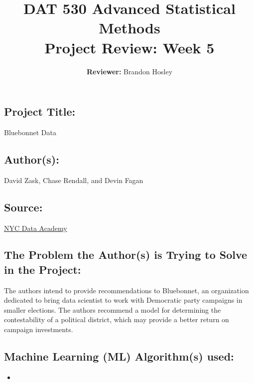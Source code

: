 \documentclass[]{article}
\title{\textbf{DAT 530 Advanced Statistical Methods}\\
	\normalsize{Project Review: Week 5} }
\author{\textbf{Reviewer: }
	Brandon Hosley}
\begin{document}
\setlength{\droptitle}{-10em} 
\pretitle{\begin{flushleft}\LARGE} %
	\posttitle{\end{flushleft}}
\preauthor{\begin{flushleft}\large} %
	\postauthor{\end{flushleft}}
\predate{\begin{flushleft}\large} %
	\postdate{\end{flushleft}}
\maketitle

\vspace{-2em}

\subsection*{Project Title:}
Bluebonnet Data

\subsection*{Author(s):}
David Zask, Chase Rendall, and Devin Fagan

\subsection*{Source:}
\href{https://nycdatascience.com/blog/student-works/bluebonnet-data/}{NYC Data Academy}

\subsection*{The Problem the Author(s) is Trying to Solve in the Project:}
The authors intend to provide recommendations to Bluebonnet, 
an organization dedicated to bring data scientist to work with Democratic party campaigns in smaller elections.
The authors recommend a model for determining the contestability of a political district, which may provide a better return on campaign investments.

\subsection*{Machine Learning (ML) Algorithm(s) used:}
\begin{itemize}
	\item 
\end{itemize}
\end{document}

